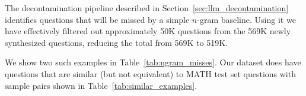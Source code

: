 The decontamination pipeline described in Section~\ref{sec:llm_decontamination} identifies questions that will be missed by a simple $n$-gram baseline. Using it we have effectively filtered out approximately 50K questions from the 569K newly synthesized questions, reducing the total from 569K to 519K.

We show two such examples in Table~\ref{tab:ngram_misses}. 
Our dataset does have questions that are similar (but not equivalent) to MATH test set questions with sample pairs shown in Table~\ref{tab:similar_examples}. 






